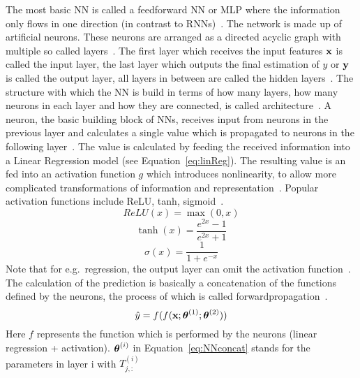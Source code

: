 The most basic \ac{NN} is called a feedforward \ac{NN} or \ac{MLP} where the information only
flows in one direction (in contrast to \acp{RNN})~\citep{goodfellow_deep_2016}.
The network is made up of artificial neurons.
These neurons are arranged as a directed acyclic graph with multiple so
called layers~\citep{goodfellow_deep_2016}.
The first layer which receives the input features $\textbf{x}$ is called the input layer, the last layer
which outputs the final estimation of $y$ or $\textbf{y}$ is called the output layer, all layers in between
are called the hidden layers~\citep{shrestha_review_2019}.
The structure with which the \ac{NN} is build in terms of how many layers, how many neurons in each
layer and how they are connected, is called architecture~\citep{goodfellow_deep_2016}.
A neuron, the basic building block of \acp{NN}, receives input from neurons in the previous layer
and calculates a single value which is propagated to neurons in the following
layer~\citep{shrestha_review_2019}.
The value is calculated by feeding the received information into a Linear Regression model (see
Equation~\ref{eq:linReg}).
The resulting value is an fed into an activation function $g$ which introduces nonlinearity, to allow
more complicated transformations of information and representation~\citep{goodfellow_deep_2016}.
Popular activation functions include ReLU, tanh, sigmoid~\citep{shrestha_review_2019}.
\begin{equation}\label{eq:relu}
    ReLU(x)=\max(0,x)
\end{equation}
\begin{equation}\label{eq:tanh}
    \tanh(x)=\frac{e^{2x}-1}{e^{2x}+1}
\end{equation}
\begin{equation}\label{eq:sigmoid}
    \sigma(x)=\frac{1}{1+e^{-x}}
\end{equation}
Note that for e.g.\ regression, the output layer can omit the activation
function~\citep{goodfellow_deep_2016}.
The calculation of the prediction is basically a concatenation of the functions defined by the neurons,
the process of which is called forwardpropagation~\citep{goodfellow_deep_2016}.
\begin{equation}\label{eq:NNconcat}
    \hat{y}=f(f(\textbf{x};\boldsymbol{\theta}^{(1)};\boldsymbol{\theta}^{(2)}))
\end{equation}
Here $f$ represents the function which is performed by the neurons (linear regression + activation).
$\boldsymbol{\theta}^{(i)}$ in Equation~\ref{eq:NNconcat} stands for the parameters in layer i with $T^{(i)}_{j,:}$
